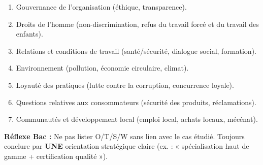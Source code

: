 \documentclass[11pt]{article}
\begin{document}
\begin{methode}
\begin{enumerate}
              \begin{enumerate}
                  \item Gouvernance de l'organisation (éthique, transparence).
                  \item Droits de l'homme (non-discrimination, refus du travail forcé et du travail des enfants).
                  \item Relations et conditions de travail (santé/sécurité, dialogue social, formation).
                  \item Environnement (pollution, économie circulaire, climat).
                  \item Loyauté des pratiques (lutte contre la corruption, concurrence loyale).
                  \item Questions relatives aux consommateurs (sécurité des produits, réclamations).
                  \item Communautés et développement local (emploi local, achats locaux, mécénat).
              \end{enumerate}
    \end{enumerate}
    \textbf{Réflexe Bac :} Ne pas lister O/T/S/W sans lien avec le cas étudié. Toujours conclure par \textbf{UNE} orientation stratégique claire (ex. : « spécialisation haut de gamme + certification qualité »).
\end{methode}
\end{document}
